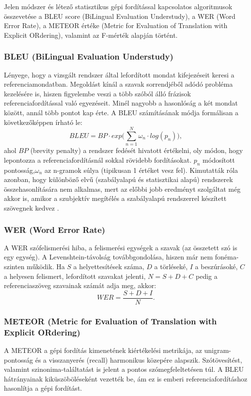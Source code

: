 Jelen módszer és létező statisztikus gépi fordítással kapcsolatos algoritmusok összevetése a BLEU score (BiLingual Evaluation Understudy), a WER (Word Error Rate), a METEOR értéke (Metric for Evaluation of Translation with Explicit ORdering), valamint az F-mérték alapján történt.


\subsubsection{BLEU (BiLingual Evaluation Understudy)}
Lényege, hogy a vizsgált rendszer által lefordított mondat kifejezéseit keresi a referenciamondatban. Megoldást kínál a szavak sorrendjéből adódó probléma kezelésére is, hiszen figyelembe veszi a több szóból álló frázisok referenciafordítással való egyezéseit. Minél nagyobb a hasonlóság a két mondat között, annál több pontot kap érte. A BLEU számításának módja formálisan a következőképpen írható le: 
\begin{equation}
BLEU = BP \cdot exp\Big(\sum_{n=1}^N \omega_n \cdot log(p_n)\Big),
\end{equation}
ahol $BP$ (brevity penalty) a rendszer fedését hivatott értékelni, oly módon, hogy lepontozza a referenciafordításnál sokkal rövidebb fordításokat. $p_n$ módosított pontosság,$\omega_n$ az n-gramok súlya (tipikusan 1 értéket vesz fel). Kimutatták róla azonban, hogy különböző elvű (szabályalapú és statisztikai alapú) rendszerek összehasonlítására nem alkalmas, mert az előbbi jobb eredményt szolgáltat még akkor is, amikor a szubjektív megítélés a szabályalapú rendszerrel készített szövegnek kedvez \cite{koehn-monz:2006:WMT}.


\subsubsection{WER (Word Error Rate)}
A WER szófelismerési hiba, a felismerési egységek a szavak (az összetett szó is egy egység). A Levenshtein-távolság továbbgondolása, hiszen már nem fonéma-szinten működik. Ha $S$ a helyettesítések száma, $D$ a törléseké, $I$ a beszúrásoké, $C$ a helyesen felismert, lefordított szavakat jelenti, $N = S+D+C$ pedig a referenciaszöveg szavainak számát adja meg, akkor:
\begin{equation}
WER = \frac{S + D + I}{N}.
\end{equation}


\subsubsection{METEOR (Metric for Evaluation of Translation with Explicit ORdering)}
A METEOR a gépi fordítás kimenetének kiértékelési metrikája, az unigram-pontosság és a visszanyerés (recall) harmonikus közepére alapszik. Szótövesítést, valamint szinonima-találtatást is jelent a pontos szómegfeleltetésen túl. A BLEU hátrányainak kiküszöböléseként vezették be, ám ez is emberi referenciafordításhoz hasonlítja a gépi fordítást.


